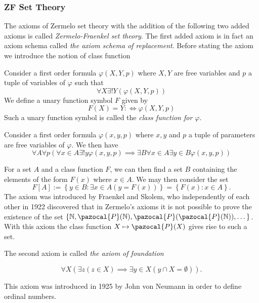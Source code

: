 \subsubsection{ZF Set Theory}
The axioms of Zermelo set theory with the addition of the following two added axioms is called \textit{Zermelo-Fraenkel set theory}. The first added axiom is in fact an axiom schema called \textit{the axiom schema of replacement}. Before stating the axiom we introduce the notion of class function
\begin{definition}
    Consider a first order formula $\varphi(X,Y,p)$ where $X,Y$ are free variables and $p$ a tuple of variables of $\varphi$ such that 
    $$\forall X\exists! Y(\varphi(X,Y,p))$$
    We define a unary function symbol $F$ given by 
    $$F(X)=Y :\iff \varphi(X,Y,p)$$
    Such a unary function symbol is called the \textit{class function for $\varphi$}.
\end{definition}
\begin{axioms}
   Consider a first order formula $\varphi(x,y,p)$ where $x,y$ and $p$ a tuple of parameters are free variables of $\varphi$. We then have 
      $$\forall A\forall p(\forall x\in A\exists! y\varphi(x,y,p)\implies \exists B\forall x\in A\exists y\in B\varphi(x,y,p))$$
\end{axioms} 
\begin{remark}
    For a set $A$ and a class function $F$, we can then find a set $B$ containing the elements of the form $F(x)$ where $x\in A$. We may then consider the set 
    $$F[A] := \left\{ y\in B: \exists x\in A(y=F(x))\right\}=\left\{F(x) : x\in A\right\}.$$
    The axiom was introduced by Fraenkel and Skolem, who independently of each other in 1922 discovered that in Zermelo's axioms it is not possible to prove the existence of the set $\{\N,\pazocal{P}(\N),\pazocal{P}(\pazocal{P}(\N)),\dots\}$. With this axiom the class function $X\mapsto \pazocal{P}(X)$ gives rise to such a set. 
\end{remark}
The second axiom is called \textit{the axiom of foundation}
\begin{axioms}
    $$\forall X\left(\exists z(z\in X)\implies \exists y\in X(y\cap X = \emptyset)\right).$$
\end{axioms}
This axiom was introduced in 1925 by John von Neumann in order to define ordinal numbers.
